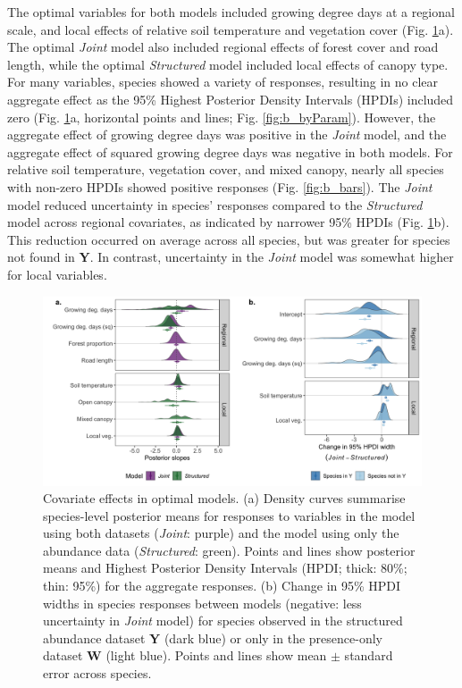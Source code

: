 \documentclass[preprint,final,times,12pt,3p]{elsarticle}
\begin{document}
The optimal variables for both models included growing degree days at a regional scale, and local effects of relative soil temperature and vegetation cover (Fig. \ref{fig:slope_means}a). The optimal \emph{Joint} model also included regional effects of forest cover and road length, while the optimal \emph{Structured} model included local effects of canopy type. For many variables, species showed a variety of responses, resulting in no clear aggregate effect as the 95\% Highest Posterior Density Intervals (HPDIs) included zero (Fig. \ref{fig:slope_means}a, horizontal points and lines; Fig. \ref{fig:b_byParam}). However, the aggregate effect of growing degree days was positive in the \emph{Joint} model, and the aggregate effect of squared growing degree days was negative in both models. For relative soil temperature, vegetation cover, and mixed canopy, nearly all species with non-zero HPDIs showed positive responses (Fig. \ref{fig:b_bars}). The \emph{Joint} model reduced uncertainty in species' responses compared to the \emph{Structured} model across regional covariates, as indicated by narrower 95\% HPDIs (Fig. \ref{fig:slope_means}b). This reduction occurred on average across all species, but was greater for species not found in \textbf{Y}. In contrast, uncertainty in the \emph{Joint} model was somewhat higher for local variables.

\begin{figure}
\centering\includegraphics[width=6in]{../../../ms/1_Ecography/1/figs/slope_means+HDI.png}
\caption{\label{fig:slope_means} Covariate effects in optimal models. (a) Density curves summarise species-level posterior means for responses to variables in the model using both datasets (\emph{Joint}: purple) and the model using only the abundance data (\emph{Structured}: green). Points and lines show posterior means and Highest Posterior Density Intervals (HPDI; thick: 80\%; thin: 95\%) for the aggregate responses. (b) Change in 95\% HPDI widths in species responses between models (negative: less uncertainty in \emph{Joint} model) for species observed in the structured abundance dataset \textbf{Y} (dark blue) or only in the presence-only dataset \textbf{W} (light blue). Points and lines show mean $\pm$ standard error across species. }
\end{figure}
\end{document}
